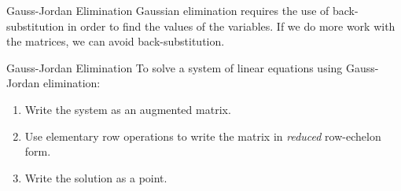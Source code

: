 \documentclass[t, aspectratio=169]{beamer}
\begin{document}
	\begin{frame}{Gauss-Jordan Elimination}
		Gaussian elimination requires the use of back-substitution in order to find the values of the variables. If we do more work with the matrices, we can avoid back-substitution. \pause
		
		\begin{block}{Gauss-Jordan Elimination}
			To solve a system of linear equations using Gauss-Jordan elimination: \begin{enumerate}[1)]
				\item Write the system as an augmented matrix. 
				\item Use elementary row operations to write the matrix in \textit{reduced} row-echelon form.
				\item Write the solution as a point.
			\end{enumerate}
		\end{block}
	\end{frame}
	
\end{document}

